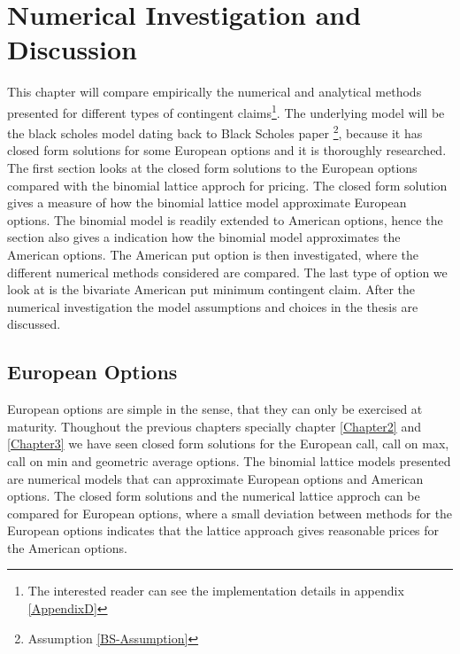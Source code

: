 
\chapter{Numerical Investigation and Discussion} %

\label{Chapter6} %

This chapter will compare empirically the numerical and analytical methods presented for different types of contingent claims\footnote{The interested reader can see the implementation details in appendix \ref{AppendixD}}. The underlying model will be the black scholes model dating back to Black Scholes paper \parencite{B-S-Paper}\footnote{Assumption \ref{BS-Assumption}}, because it has closed form solutions for some European options and it is thoroughly researched.\\

The first section looks at the closed form solutions to the European options compared with the binomial lattice approch for pricing. The closed form solution gives a measure of how the binomial lattice model approximate European options. The binomial model is readily extended to American options, hence the section also gives a indication how the binomial model approximates the American options. The American put option is then investigated, where the different numerical methods considered are compared. The last type of option we look at is the bivariate American put minimum contingent claim. After the numerical investigation the model assumptions and choices in the thesis are discussed.


\section{European Options}\label{EuroOption}
European options are simple in the sense, that they can only be exercised at maturity. Thoughout the previous chapters specially chapter \ref{Chapter2} and \ref{Chapter3} we have seen closed form solutions for the European call, call on max, call on min and geometric average options. The binomial lattice models presented are numerical models that can approximate European options and American options. The closed form solutions and the numerical lattice approch can be compared for European options, where a small deviation between methods for the European options indicates that the lattice approach gives reasonable prices for the American options.\\

